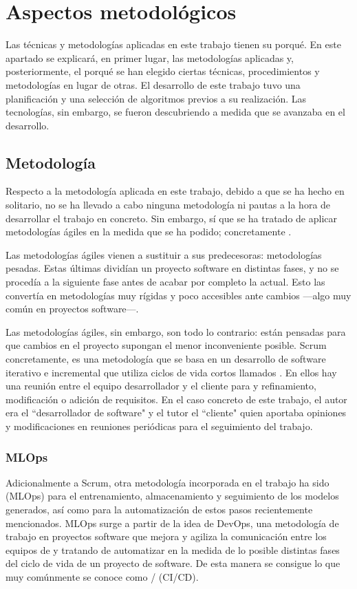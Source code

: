 \pagestyle{plain}
	
\section{Aspectos metodológicos}
Las técnicas y metodologías aplicadas en este trabajo tienen su porqué. En este apartado se explicará, en primer lugar, las metodologías aplicadas y, posteriormente, el porqué se han elegido ciertas técnicas, procedimientos y metodologías en lugar de otras. El desarrollo de este trabajo tuvo una planificación y una selección de algoritmos previos a su realización. Las tecnologías, sin embargo, se fueron descubriendo a medida que se avanzaba en el desarrollo.

\subsection{Metodología}
Respecto a la metodología aplicada en este trabajo, debido a que se ha hecho en solitario, no se ha llevado a cabo ninguna metodología ni pautas a la hora de desarrollar el trabajo en concreto. Sin embargo, sí que se ha tratado de aplicar metodologías ágiles en la medida que se ha podido; concretamente . 

Las metodologías ágiles vienen a sustituir a sus predecesoras: metodologías pesadas. Estas últimas dividían un proyecto software en distintas fases, y no se procedía  a la siguiente fase antes de acabar por completo la actual. Esto las convertía en metodologías muy rígidas y poco accesibles ante cambios ---algo muy común en proyectos software---. 

Las metodologías ágiles, sin embargo, son todo lo contrario: están pensadas para que cambios en el proyecto supongan el menor inconveniente posible. Scrum concretamente, es una metodología que se basa en un desarrollo de software iterativo e incremental que utiliza ciclos de vida cortos llamados . En ellos hay una reunión entre el equipo desarrollador y el cliente para  y refinamiento, modificación o adición de requisitos. En el caso concreto de este trabajo, el autor era el ``desarrollador de software" y el tutor el ``cliente" quien aportaba opiniones y modificaciones en reuniones periódicas para el seguimiento del trabajo.

\subsubsection{MLOps}
Adicionalmente a Scrum, otra metodología incorporada en el trabajo ha sido  (MLOps) para el entrenamiento, almacenamiento y seguimiento de los modelos generados, así como para la automatización de estos pasos recientemente mencionados. MLOps surge a partir de la idea de DevOps, una metodología de trabajo en proyectos software que mejora y agiliza la comunicación entre los equipos de  y  tratando de automatizar en la medida de lo posible distintas fases del ciclo de vida de un proyecto de software. De esta manera se consigue lo que muy comúnmente se conoce como / (CI/CD).

